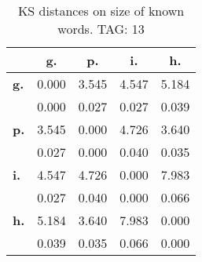 \begin{table}[h!]
\begin{center}
\begin{tabular}{| l || c | c | c | c |}\hline
 & {\bf g.} & {\bf p.} & {\bf i.} & {\bf h.} \\\hline\hline
{\bf g.} & 0.000 & 3.545 & 4.547 & 5.184 \\
{\bf } & 0.000 & 0.027 & 0.027 & 0.039 \\\hline
{\bf p.} & 3.545 & 0.000 & 4.726 & 3.640 \\
{\bf } & 0.027 & 0.000 & 0.040 & 0.035 \\\hline
{\bf i.} & 4.547 & 4.726 & 0.000 & 7.983 \\
{\bf } & 0.027 & 0.040 & 0.000 & 0.066 \\\hline
{\bf h.} & 5.184 & 3.640 & 7.983 & 0.000 \\
{\bf } & 0.039 & 0.035 & 0.066 & 0.000 \\\hline
\end{tabular}
\caption{KS distances on size of known words. TAG: 13}
\end{center}
\end{table}
